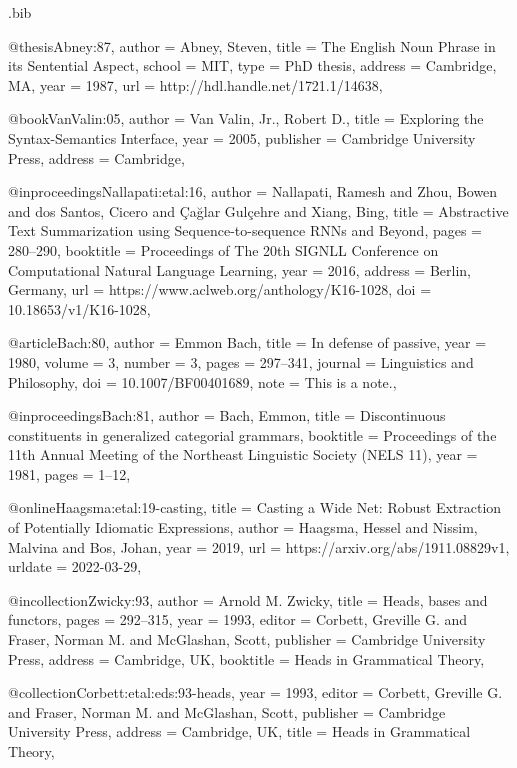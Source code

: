 \begin{filecontents}[overwrite]{\jobname.bib}

@thesis{Abney:87,
  author = {Abney, Steven},
  title = {The {English} Noun Phrase in its Sentential Aspect},
  school = {MIT},
  type = {PhD thesis},
  address = {Cambridge, MA},
  year = {1987},
  url = {http://hdl.handle.net/1721.1/14638},
}

@book{VanValin:05,
  author = {Van Valin, Jr., Robert D.},
  title = {Exploring the Syntax-Semantics Interface},
  year = {2005},
  publisher = {Cambridge University Press},
  address = {Cambridge},
}


@inproceedings{Nallapati:etal:16,
  author = {Nallapati, Ramesh and Zhou, Bowen and dos Santos, Cicero and  Çağlar Gulçehre and Xiang, Bing},
  title = {Abstractive Text Summarization using Sequence-to-sequence {RNN}s and Beyond},
  pages = {280--290},
  booktitle = {Proceedings of The 20th {SIGNLL} Conference on Computational Natural Language Learning},
  year = {2016},
  address = {Berlin, Germany},
  url = {https://www.aclweb.org/anthology/K16-1028},
  doi = {10.18653/v1/K16-1028},
}

@article{Bach:80,
  author = {Emmon Bach},
  title = {In defense of passive},
  year = {1980},
  volume = {3},
  number = {3},
  pages = {297--341},
  journal = {Linguistics and Philosophy},
  doi = {10.1007/BF00401689},
  note = {This is a note.},
}

@inproceedings{Bach:81,
  author = {Bach, Emmon},
  title = {Discontinuous constituents in generalized categorial grammars},
  booktitle = {Proceedings of the 11th Annual Meeting of the Northeast Linguistic Society (NELS 11)},
  year = {1981},
  pages = {1--12},
}

@online{Haagsma:etal:19-casting,
  title = {Casting a Wide Net: {Robust} Extraction of Potentially Idiomatic Expressions},
  author = {Haagsma, Hessel and Nissim, Malvina and Bos, Johan},
  year = {2019},
  url = {https://arxiv.org/abs/1911.08829v1},
  urldate = {2022-03-29},
}

@incollection{Zwicky:93,
  author = {Arnold M. Zwicky},
  title = {Heads, bases and functors},
  pages = {292--315},
  year = {1993},
  editor = {Corbett, Greville G. and Fraser, Norman M. and McGlashan, Scott},
  publisher = {Cambridge University Press},
  address = {Cambridge, UK},
  booktitle = {Heads in Grammatical Theory},
}

@collection{Corbett:etal:eds:93-heads,
  year = {1993},
  editor = {Corbett, Greville G. and Fraser, Norman M. and McGlashan, Scott},
  publisher = {Cambridge University Press},
  address = {Cambridge, UK},
  title = {Heads in Grammatical Theory},
}


\end{filecontents}
